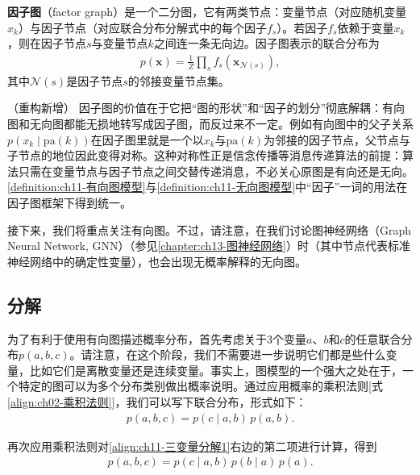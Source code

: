 \documentclass[../../main.tex]{subfiles}
\begin{document}
\begin{definition}[因子图]\label{definition:ch11-因子图}
\textbf{因子图}（factor graph）是一个二分图，它有两类节点：变量节点（对应随机变量$x_k$）与因子节点（对应联合分布分解式中的每个因子$f_s$）。若因子$f_s$依赖于变量$x_k$，则在因子节点$s$与变量节点$k$之间连一条无向边。因子图表示的联合分布为
\begin{align}
  p(\mathbf{x}) = \frac{1}{Z}\prod_{s}f_s(\mathbf{x}_{\mathcal{N}(s)}),
  \label{align:ch11-因子图分解}
\end{align}
其中$\mathcal{N}(s)$是因子节点$s$的邻接变量节点集。
\end{definition}

\begin{remark}（重构新增）
因子图的价值在于它把“图的形状”和“因子的划分”彻底解耦：有向图和无向图都能无损地转写成因子图，而反过来不一定。例如有向图中的父子关系$p(x_k\mid \mathrm{pa}(k))$在因子图里就是一个以$x_k$与$\mathrm{pa}(k)$为邻接的因子节点，父节点与子节点的地位因此变得对称。这种对称性正是信念传播等消息传递算法的前提：算法只需在变量节点与因子节点之间交替传递消息，不必关心原图是有向还是无向。\cref{definition:ch11-有向图模型}与\cref{definition:ch11-无向图模型}中“因子”一词的用法在因子图框架下得到统一。
\end{remark}

接下来，我们将重点关注有向图。不过，请注意，在我们讨论图神经网络（Graph Neural Network, GNN）（参见\cref{chapter:ch13-图神经网络}）时（其中节点代表标准神经网络中的确定性变量），也会出现无概率解释的无向图。

\subsection{分解}\label{subsection:ch11-分解}

为了有利于使用有向图描述概率分布，首先考虑关于3个变量$a$、$b$和$c$的任意联合分布$p(a,b,c)$。请注意，在这个阶段，我们不需要进一步说明它们都是些什么变量，比如它们是离散变量还是连续变量。事实上，图模型的一个强大之处在于，一个特定的图可以为多个分布类别做出概率说明。通过应用概率的乘积法则[式\eqref{align:ch02-乘积法则}]，我们可以写下联合分布，形式如下：
\begin{align}
  p(a,b,c) = p(c\mid a,b)\,p(a,b).
  \label{align:ch11-三变量分解1}
\end{align}

再次应用乘积法则对\eqref{align:ch11-三变量分解1}右边的第二项进行计算，得到
\begin{align}
  p(a,b,c) = p(c\mid a,b)\,p(b\mid a)\,p(a).
  \label{align:ch11-三变量分解2}
\end{align}
\end{document}
